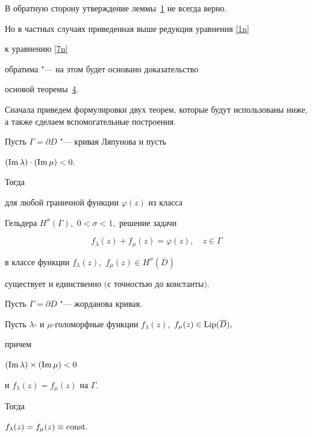 \smallskip



В обратную сторону утверждение леммы~\hyperlink{nik:lemma1}{1}  не всегда верно.

Но в частных случаях приведенная выше редукция   уравнения \eqref{1n}

к уравнению \eqref{7n}

обратима "--- на этом будет основано доказательство

основой   теоремы~\hyperlink{nik:th4}{4}.



\smallskip




 Сначала приведем формулировки двух теорем, которые будут   использованы ниже,    а также  сделаем  вспомогательные построения.



\smallskip



\hypertarget{nik:th2}{}

\begin{theorem}Пусть  $\Gamma=\partial D$ "--- кривая Ляпунова и пусть

$(\mathop{\rm Im} \lambda)\cdot(\mathop{\rm Im} \mu)<0.$

  Тогда

 для любой граничной функции $\varphi(z)$ из класса

Гельдера $H^\sigma(\Gamma),$ $0<\sigma<1,$  решение задачи

 $$

f_\lambda(z)+f_\mu(z)=\varphi(z), \quad z\in\Gamma

$$

в классе  функции $f_\lambda(z),$ $f_\mu(z)\in H^\sigma(\overline{D})$

существует и  единственно $($с точностью до константы$).$

\end{theorem}



\smallskip



\hypertarget{nik:th3}{}



 \begin{theorem}Пусть $\Gamma=\partial D$ "--- жорданова  кривая$.$

 Пусть  $\lambda$- и $\mu$-голоморфные функции $f_\lambda(z), $ $f_\mu(z)\in{\rm Lip}(\overline{D}),$

 причем

 $ (\mathop{\rm Im}\lambda)\times(\mathop{\rm Im}\mu)<0$

 и $f_\lambda(z)=f_\mu(z)$ на $\Gamma.$ 

 Тогда

 $f_\lambda(z)=f_\mu(z)\equiv{\rm const}.$

 \end{theorem}



